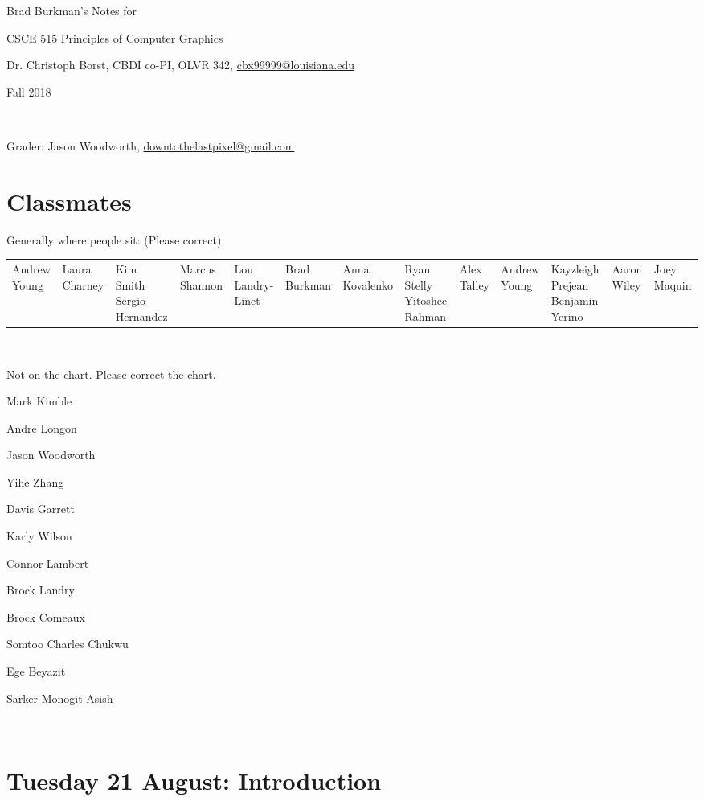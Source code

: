 \documentclass[12pt]{article}
\begin{document}
\setlength{\parindent}{0pt}
\begin{spacing}{1.2}

%
%

Brad Burkman's Notes for

\qquad CSCE 515 Principles of Computer Graphics

\qquad Dr. Christoph Borst, CBDI co-PI, 
OLVR 342, 
\url{cbx99999@louisiana.edu}

\qquad Fall 2018

\

Grader:  Jason Woodworth, \url{downtothelastpixel@gmail.com}

\tableofcontents

\section{Classmates}

Generally where people sit:  (Please correct)

\begin{tabular}{lllll}
	Andrew Young & Laura Charney & Kim Smith \cr
	Sergio Hernandez & Marcus Shannon & Lou Landry-Linet & Brad Burkman & Anna Kovalenko \cr
	& Ryan Stelly \cr
	Yitoshee Rahman & Alex Talley & Andrew Young & Kayzleigh Prejean \cr
	Benjamin Yerino & Aaron Wiley & Joey Maquin \cr
\end{tabular}

\

Not on the chart.  Please correct the chart.  

Mark Kimble

Andre Longon

Jason Woodworth

Yihe Zhang

Davis Garrett

Karly Wilson

Connor Lambert

Brock Landry

Brock Comeaux

Somtoo Charles Chukwu

Ege Beyazit

Sarker Monogit Asish

\


\section{Tuesday 21 August:  Introduction}


\end{spacing}
\end{document}
